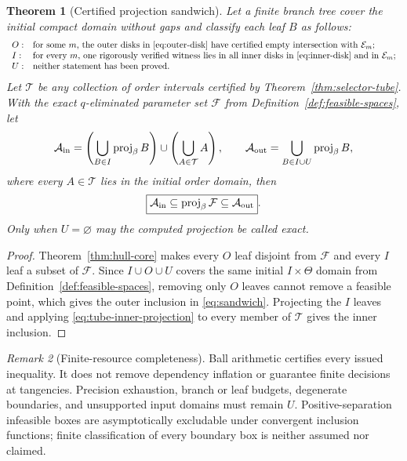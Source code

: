 \documentclass[11pt]{article}
\newtheorem{theorem}{Theorem}
\theoremstyle{definition}
\theoremstyle{remark}
\newtheorem{remark}[theorem]{Remark}
\newcommand{\Aset}{\mathcal A}
\newcommand{\Eset}{\mathcal E}
\newcommand{\proj}{\operatorname{proj}}
\begin{document}
\begin{theorem}[Certified projection sandwich]
\label{thm:projection-sandwich}
Let a finite branch tree cover the initial compact domain without gaps and
classify each leaf \(B\) as follows:
\[
\begin{array}{ll}
O:&\text{for some \(m\), the outer disks in \eqref{eq:outer-disk}
have certified empty intersection with \(\Eset_m\);}\\
I:&\text{for every \(m\), one rigorously verified witness lies in
all inner disks in \eqref{eq:inner-disk} and in \(\Eset_m\);}\\
U:&\text{neither statement has been proved.}
\end{array}
\]
Let \(\mathcal T\) be any collection of order intervals certified by
Theorem~\ref{thm:selector-tube}.  With the exact \(q\)-eliminated parameter set
\(\mathcal F\) from Definition~\ref{def:feasible-spaces}, let
\[
 \Aset_{\rm in}=\left(\bigcup_{B\in I}\proj_\beta B\right)
 \cup\left(\bigcup_{A\in\mathcal T}A\right),\qquad
 \Aset_{\rm out}=\bigcup_{B\in I\cup U}\proj_\beta B,
\]
where every \(A\in\mathcal T\) lies in the initial order domain, then
\begin{equation}
 \boxed{\Aset_{\rm in}\subseteq\proj_\beta\mathcal F
 \subseteq\Aset_{\rm out}}.
 \label{eq:sandwich}
\end{equation}
Only when \(U=\varnothing\) may the computed projection be called exact.
\end{theorem}
\begin{proof}
Theorem~\ref{thm:hull-core} makes every \(O\) leaf disjoint from
\(\mathcal F\) and every \(I\) leaf a subset of \(\mathcal F\).  Since
\(I\cup O\cup U\) covers the same initial \(I\times\Theta\) domain from
Definition~\ref{def:feasible-spaces}, removing only \(O\) leaves cannot remove
a feasible point, which gives the outer inclusion in
\eqref{eq:sandwich}.  Projecting the \(I\) leaves and
applying \eqref{eq:tube-inner-projection} to every member of \(\mathcal T\)
gives the inner inclusion.
\end{proof}

\begin{remark}[Finite-resource completeness]
Ball arithmetic certifies every issued inequality.  It does not remove
dependency inflation or guarantee finite decisions at tangencies.  Precision
exhaustion, branch or leaf budgets, degenerate boundaries, and unsupported
input domains must remain \(U\).  Positive-separation infeasible boxes are
asymptotically excludable under convergent inclusion functions; finite
classification of every boundary box is neither assumed nor claimed.
\end{remark}
\end{document}
